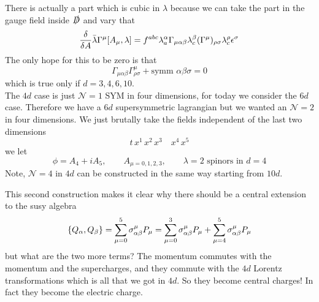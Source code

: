 \documentclass[11pt]{article}
\theoremstyle{definition}
\numberwithin{equation}{section}
\newcommand*\cN{\mathcal{N}}
\begin{document}
There is actually a part which is cubic in $\lambda$ because we can take the part in the gauge field inside $\slashed{D}$ and vary that
\begin{equation}
	\frac{\delta}{\delta A}\bar\lambda\Gamma^{\mu}\comm{A_{\mu}}{\lambda}=f^{abc}\lambda^{\alpha}_{a}\Gamma_{\mu\alpha\beta}\lambda^{\beta}_{c}(\Gamma^{\mu})_{\rho\sigma}\lambda_{c}^{\rho}\epsilon^{\sigma}
\end{equation}
The only hope for this to be zero is that
\begin{equation}
	\Gamma_{\mu\alpha\beta}\Gamma^{\mu}_{\rho\sigma}+\text{symm }\alpha\beta\sigma=0
\end{equation}
which is true only if $d=3,4,6,10$.\\
The $4d$ case is just $\cN=1$ SYM in four dimensions, for today we consider the $6d$ case. Therefore we have a $6d$ supersymmetric lagrangian but we wanted an $\cN=2$ in four dimensions. We just brutally take the fields independent of the last two dimensions
\begin{equation}
	t\,x^{1}\,x^{2}\,x^{3}\quad x^{4}\,x^{5}
\end{equation}
we let
\begin{equation}
	\phi=A_{4}+iA_{5},\qquad A_{\mu=0,1,2,3},\qquad \lambda=2\text{ spinors in }d=4 
\end{equation}
Note, $\cN=4$ in $4d$ can be constructed in the same way starting from $10d$.

This second construction makes it clear why there should be a central extension to the susy algebra
\begin{equation}
	\acomm{Q_{\alpha}}{Q_{\beta}}=\sum_{\mu=0}^{5}\sigma_{\alpha\beta}^{\mu}P_{\mu}=\sum_{\mu=0}^{3}\sigma_{\alpha\beta}^{\mu}P_{\mu}+\sum_{\mu=4}^{5}\sigma_{\alpha\beta}^{\mu}P_{\mu}
\end{equation}
but what are the two more terms? The momentum commutes with the momentum and the supercharges, and they commute with the $4d$ Lorentz transformations which is all that we got in $4d$. So they become central charges! In fact they become the electric charge.
\end{document}

